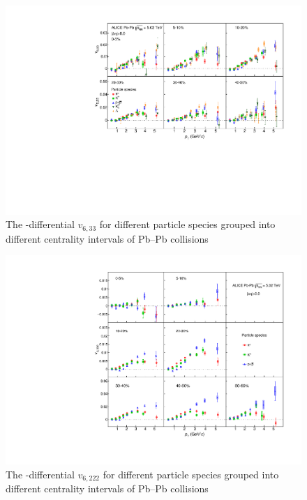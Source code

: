 \documentclass[ALICE,manyauthors]{cernphprep}
\begin{document}
\begin{figure}[!htb]
\begin{center}
\includegraphics[scale=0.82]{figures/results/All_v633_gap00_PID2_3by2.pdf}

\end{center}
\caption{The \pT-differential $v_{6,33}$ for different particle species grouped into different centrality intervals of Pb--Pb collisions \sNN}
\label{v633_particleDependence}
\end{figure}

\begin{figure}[!htb]
\begin{center}
\includegraphics[scale=0.82]{figures/results/All_v6222_gap00_PID2_3by3.pdf}

\end{center}
\caption{The \pT-differential $v_{6,222}$ for different particle species grouped into different centrality intervals of Pb--Pb collisions \sNN}
\label{v6222_particleDependence}
\end{figure}
\end{document}
